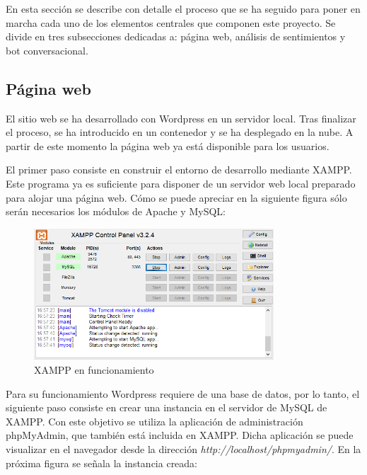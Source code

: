 En esta sección se describe con detalle el proceso que se ha seguido para poner en marcha cada uno de los elementos centrales que componen este proyecto. Se divide en tres subsecciones dedicadas a: página web, análisis de sentimientos y bot conversacional.

\subsection{Página web}

El sitio web se ha desarrollado con Wordpress en un servidor local. Tras finalizar el proceso, se ha introducido en un contenedor y se ha desplegado en la nube. A partir de este momento la página web ya está disponible para los usuarios.

El primer paso consiste en construir el entorno de desarrollo mediante XAMPP. Este programa ya es suficiente para disponer de un servidor web local preparado para alojar una página web. Cómo se puede apreciar en la siguiente figura sólo serán necesarios los módulos de Apache y MySQL:

\begin{figure}[ht]
	\begin{center}
		\includegraphics[width = 0.80\textwidth]{Figuras/XAMPP.PNG}
	\end{center}
	\caption{\label{fig:xampp} XAMPP en funcionamiento}
\end{figure}

Para su funcionamiento Wordpress requiere de una base de datos, por lo tanto, el siguiente paso consiste en crear una instancia en el servidor de MySQL de XAMPP. Con este objetivo se utiliza la aplicación de administración phpMyAdmin, que también está incluida en XAMPP. Dicha aplicación se puede visualizar en el navegador desde la dirección \textit{http://localhost/phpmyadmin/}. En la próxima figura se señala la instancia creada:

